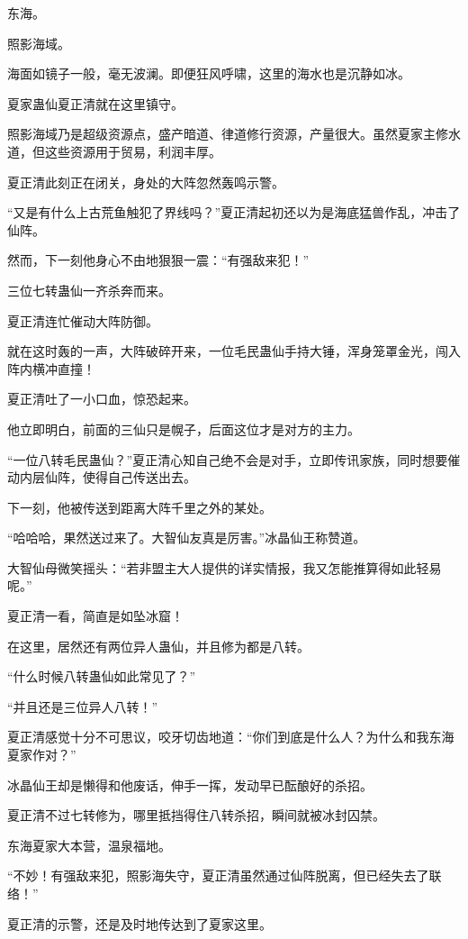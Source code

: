 
\begin{this_body}

东海。

照影海域。

海面如镜子一般，毫无波澜。即便狂风呼啸，这里的海水也是沉静如冰。

夏家蛊仙夏正清就在这里镇守。

照影海域乃是超级资源点，盛产暗道、律道修行资源，产量很大。虽然夏家主修水道，但这些资源用于贸易，利润丰厚。

夏正清此刻正在闭关，身处的大阵忽然轰鸣示警。

“又是有什么上古荒鱼触犯了界线吗？”夏正清起初还以为是海底猛兽作乱，冲击了仙阵。

然而，下一刻他身心不由地狠狠一震：“有强敌来犯！”

三位七转蛊仙一齐杀奔而来。

夏正清连忙催动大阵防御。

就在这时轰的一声，大阵破碎开来，一位毛民蛊仙手持大锤，浑身笼罩金光，闯入阵内横冲直撞！

夏正清吐了一小口血，惊恐起来。

他立即明白，前面的三仙只是幌子，后面这位才是对方的主力。

“一位八转毛民蛊仙？”夏正清心知自己绝不会是对手，立即传讯家族，同时想要催动内层仙阵，使得自己传送出去。

下一刻，他被传送到距离大阵千里之外的某处。

“哈哈哈，果然送过来了。大智仙友真是厉害。”冰晶仙王称赞道。

大智仙母微笑摇头：“若非盟主大人提供的详实情报，我又怎能推算得如此轻易呢。”

夏正清一看，简直是如坠冰窟！

在这里，居然还有两位异人蛊仙，并且修为都是八转。

“什么时候八转蛊仙如此常见了？”

“并且还是三位异人八转！”

夏正清感觉十分不可思议，咬牙切齿地道：“你们到底是什么人？为什么和我东海夏家作对？”

冰晶仙王却是懒得和他废话，伸手一挥，发动早已酝酿好的杀招。

夏正清不过七转修为，哪里抵挡得住八转杀招，瞬间就被冰封囚禁。

东海夏家大本营，温泉福地。

“不妙！有强敌来犯，照影海失守，夏正清虽然通过仙阵脱离，但已经失去了联络！”

夏正清的示警，还是及时地传达到了夏家这里。


\end{this_body}
